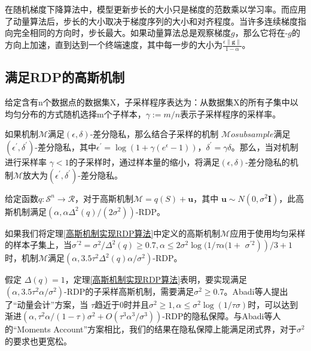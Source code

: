 在随机梯度下降算法中，模型更新步长的大小只是梯度的范数乘以学习率。而应用了动量算法后，步长的大小取决于梯度序列的大小和对齐程度。当许多连续梯度指向完全相同的方向时，步长最大。如果动量算法总是观察梯度$g$，那么它将在-$g$的方向上加速，直到达到一个终端速度，其中每一步的大小为$\frac{\epsilon\|\boldsymbol{g}\|}{1-\alpha}$。

\subsection{满足RDP的高斯机制}
\begin{theorem}\label{子采样}
给定含有n个数据点的数据集X，子采样程序表达为：从数据集X的所有子集中以均匀分布的方式随机选择m个子样本，$\gamma:=m / n$表示子采样程序的采样率。
\end{theorem}

如果机制$\mathcal{M}$满足$(\epsilon, \delta)$-差分隐私，那么结合子采样的机制 $\mathcal{M}  o   subsample$满足$\left(\epsilon^{\prime}, \delta^{\prime}\right)$-差分隐私，其中$\epsilon^{\prime}=\log \left(1+\gamma\left(e^{\epsilon}-1\right)\right)$，$\delta^{\prime}=\gamma \delta$。那么，当对机制进行采样率 $\gamma<1$的子采样时，通过样本量的缩小，将满足$(\epsilon, \delta)$-差分隐私的机制$\mathcal{M}$放大为$\left(\epsilon^{\prime}, \delta^{\prime}\right)$-差分隐私。

\begin{theorem}\label{高斯机制实现RDP算法}
给定函数$q: \mathcal{S}^{n} \rightarrow \mathcal{R}$，对于高斯机制$\mathcal{M}=q(S)+\mathbf{u}$，其中 $\mathbf{u} \sim N\left(0, \sigma^{2} \mathbf{I}\right)$，此高斯机制满足$\left(\alpha, \alpha \Delta^{2}(q) /\left(2 \sigma^{2}\right)\right)$-RDP。
\end{theorem}

如果我们将定理\ref{高斯机制实现RDP算法}中定义的高斯机制$\mathcal{M}$应用于使用均匀采样的样本子集上，当$\sigma^{\prime 2}=\sigma^{2} / \Delta^{2}(q) \geq 0.7, \alpha \leq 2 \sigma^{2} \log (1 / \tau \alpha(1+$ $\left.\left.\sigma^{\prime 2}\right)\right) / 3+1$时，机制$\mathcal{M}$满足$\left(\alpha, 3.5 \tau^{2} \Delta^{2}(q) \alpha / \sigma^{2}\right)$-RDP。

假定 $\Delta(q)=1$，定理\ref{高斯机制实现RDP算法}表明，要实现满足 $\left(\alpha, 3.5 \tau^{2} \alpha / \sigma^{2}\right)$-RDP的子采样高斯机制，需要满足$\sigma^{2} \geq 0.7$。Abadi等人提出了“动量会计”方案，当 $\tau$趋近于0时并且$\sigma^{2} \geq 1, \alpha \leq \sigma^{2} \log (1 / \tau \sigma)$时，可以达到渐进$\left(\alpha, \tau^{2} \alpha /(1-\tau) \sigma^{2}+O\left(\tau^{3} \alpha^{3} / \sigma^{3}\right)\right)$-RDP的隐私保障。与Abadi等人的“Moments Account”方案相比，我们的结果在隐私保障上能满足闭式界，对于$\sigma^{2}$的要求也更宽松。

